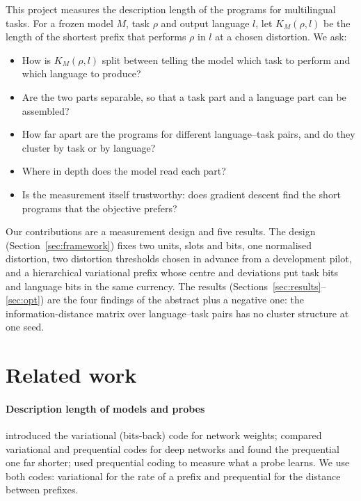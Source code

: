 \documentclass{article}
\begin{document}
This project measures the description length of the programs for multilingual tasks. For a frozen model $M$, task $\rho$ and output language $l$, let $K_M(\rho,l)$ be the length of the shortest prefix that performs $\rho$ in $l$ at a chosen distortion. We ask:
\begin{itemize}
    \item How is $K_M(\rho,l)$ split between telling the model which task to perform and which language to produce?
    \item Are the two parts separable, so that a task part and a language part can be assembled?
    \item How far apart are the programs for different language--task pairs, and do they cluster by task or by language?
    \item Where in depth does the model read each part?
    \item Is the measurement itself trustworthy: does gradient descent find the short programs that the objective prefers?
\end{itemize}

Our contributions are a measurement design and five results. The design (Section~\ref{sec:framework}) fixes two units, slots and bits, one normalised distortion, two distortion thresholds chosen in advance from a development pilot, and a hierarchical variational prefix whose centre and deviations put task bits and language bits in the same currency. The results (Sections~\ref{sec:results}--\ref{sec:opt}) are the four findings of the abstract plus a negative one: the information-distance matrix over language--task pairs has no cluster structure at one seed.

\section{Related work}
\paragraph{Description length of models and probes}
\citet{hinton1993keeping} introduced the variational (bits-back) code for network weights; \citet{blier2018description} compared variational and prequential codes for deep networks and found the prequential one far shorter; \citet{voita2020information} used prequential coding to measure what a probe learns. We use both codes: variational for the rate of a prefix and prequential for the distance between prefixes.
\end{document}
